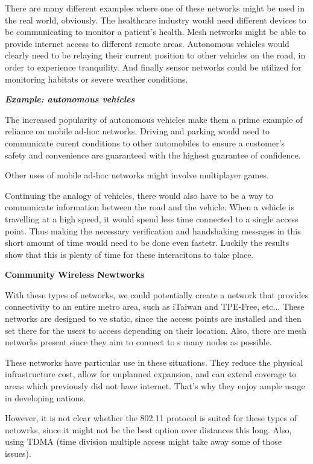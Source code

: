 \documentclass{article}
\begin{document}
There are many different examples where one of these networks might be used in the real world, obviously. The healthcare 
industry would need different devices to be communicating to monitor a patient's health. Mesh networks might be able to 
provide internet access to different remote areas. Autonomous vehicles would clearly need to be relaying their current
position to other vehicles on the road, in order to experience tranquility. And finally sensor networks could be utilized
for monitoring habitats or severe weather conditions.

\hspace{10mm}\textbf{\textit{Example: autonomous vehicles}}

The increased popularity of autonomous vehicles make them a prime example of reliance on mobile ad-hoc networks.
Driving and parking would need to communicate curent conditions to other automobiles to ensure a customer's 
safety and convenience are guaranteed with the highest guarantee of confidence.

Other uses of mobile ad-hoc networks might involve multiplayer games.

Continuing the analogy of vehicles, there would also have to be a way to communicate information between the road and 
the vehicle. When a vehicle is travelling at a high speed, it would spend less time connected to a single access point.
Thus making the necessary verification and handshaking messages in this short amount of time would need to be done even 
fastetr. Luckily the results show that this is plenty of time for these interacitons to take place.

\hspace {10mm}\textbf{Community Wireless Newtworks}

With these types of networks, we could potentially create a network that provides connectivity to an entire metro area, 
such as iTaiwan and TPE-Free, etc... These networks are designed to ve static, since the access points are installed 
and then set there for the users to access depending on their location. Also, there are mesh networks present since they 
aim to connect to s many nodes as possible.

These networks have particular use in these situations. They reduce the physical infrastructure cost, allow for unplanned 
expansion, and can extend coverage to areas which previously did not have internet. That's why they enjoy ample usage in 
developing nations.

However, it is not clear whether the 802.11 protocol is suited for these types of netowrks, since it might not be the best option
over distances this long. Also, using TDMA (time division multiple access might take away some of those issues).
\end{document}
